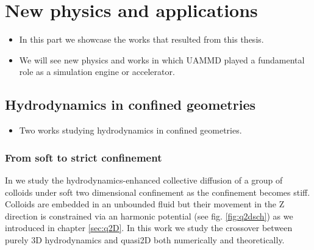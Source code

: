 \documentclass[ twoside,openright,titlepage,numbers=noenddot,%
headinclude,footinclude,cleardoublepage=empty,abstract=on,
BCOR=5mm,paper=a4,fontsize=11pt, dvipsnames
]{scrreprt}
\newcommand{\uammd}{\gls{UAMMD}\xspace}
\begin{document}
%
%

\part{New physics and applications}\label{pt:applications}
\begin{itemize}
\item In this part we showcase the works that resulted from this thesis.
\item We will see new physics and works in which \uammd played a fundamental role as a simulation engine or accelerator.
\end{itemize}

\chapter{Hydrodynamics in confined geometries}
\begin{itemize}
\item Two works studying hydrodynamics in confined geometries.
\end{itemize}
\section{From soft to strict confinement}
 In \cite{Pelaez2017} we study the hydrodynamics-enhanced collective diffusion of a group of colloids under soft two dimensional confinement as the confinement becomes stiff. Colloids are embedded in an unbounded fluid but their movement in the Z direction is constrained via an harmonic potential (see fig. \ref{fig:q2dsch}) as we introduced in chapter \ref{sec:q2D}. In this work we study the crossover between purely 3D hydrodynamics and quasi2D both numerically and theoretically.
\end{document}
